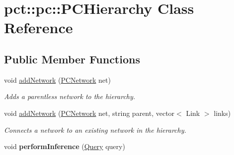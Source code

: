 \hypertarget{classpct_1_1pc_1_1_p_c_hierarchy}{\section{pct\-:\-:pc\-:\-:P\-C\-Hierarchy Class Reference}
\label{classpct_1_1pc_1_1_p_c_hierarchy}
}
\subsection*{Public Member Functions}
\begin{DoxyCompactItemize}
\item 
\hypertarget{classpct_1_1pc_1_1_p_c_hierarchy_a541515028f67150ff45e37905a2ba24e}{void \hyperlink{classpct_1_1pc_1_1_p_c_hierarchy_a541515028f67150ff45e37905a2ba24e}{add\-Network} (\hyperlink{classpct_1_1pc_1_1_p_c_network}{P\-C\-Network} net)}\label{classpct_1_1pc_1_1_p_c_hierarchy_a541515028f67150ff45e37905a2ba24e}

\begin{DoxyCompactList}\small\item\em Adds a parentless network to the hierarchy. \end{DoxyCompactList}\item 
void \hyperlink{classpct_1_1pc_1_1_p_c_hierarchy_ac577e22bdf204af786b93242b3b826f6}{add\-Network} (\hyperlink{classpct_1_1pc_1_1_p_c_network}{P\-C\-Network} net, string parent, vector$<$ Link $>$ links)
\begin{DoxyCompactList}\small\item\em Connects a network to an existing network in the hierarchy. \end{DoxyCompactList}\item 
\hypertarget{classpct_1_1pc_1_1_p_c_hierarchy_aedb4c077d40897706f2bb789d7633de2}{void {\bfseries perform\-Inference} (\hyperlink{classpct_1_1_query}{Query} query)}\label{classpct_1_1pc_1_1_p_c_hierarchy_aedb4c077d40897706f2bb789d7633de2}

\end{DoxyCompactItemize}


